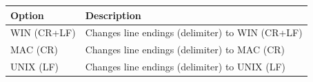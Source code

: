 \begin{scriptsize}\begin{tabularx}{\textwidth}{>{\hsize=0.3\hsize}X>{\hsize=0.7\hsize}X}\\
    \hline
    \textbf{Option} & \textbf{Description} \\
    \hline
    WIN (CR+LF) & Changes line endings (delimiter) to WIN (CR+LF) \\
    MAC (CR) & Changes line endings (delimiter) to MAC (CR) \\
    UNIX (LF) & Changes line endings (delimiter) to UNIX (LF) \\
    \hline
  \end{tabularx}\end{scriptsize}
